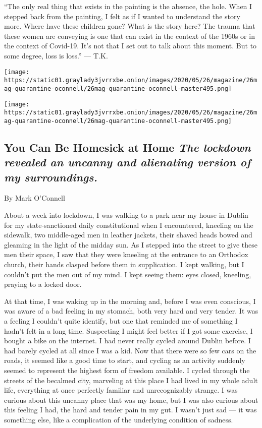 ``The only real thing that exists in the painting is the absence, the
hole. When I stepped back from the painting, I felt as if I wanted to
understand the story more. Where have these children gone? What is the
story here? The trauma that these women are conveying is one that can
exist in the context of the 1960s or in the context of Covid-19. It's
not that I set out to talk about this moment. But to some degree, loss
is loss.'' --- T.K.

\texttt{[image: https://static01.graylady3jvrrxbe.onion/images/2020/05/26/magazine/26mag-quarantine-oconnell/26mag-quarantine-oconnell-master495.png]}

\texttt{[image: https://static01.graylady3jvrrxbe.onion/images/2020/05/26/magazine/26mag-quarantine-oconnell/26mag-quarantine-oconnell-master495.png]}

\hypertarget{you-can-be-homesick-at-home-the-lockdown-revealed-an-uncanny-and-alienating-version-of-my-surroundings}{%
\subsection{\texorpdfstring{You Can Be Homesick at Home \emph{The
lockdown revealed an uncanny and alienating version of my
surroundings.}}{You Can Be Homesick at Home The lockdown revealed an uncanny and alienating version of my surroundings.}}\label{you-can-be-homesick-at-home-the-lockdown-revealed-an-uncanny-and-alienating-version-of-my-surroundings}}

By Mark O'Connell

About a week into lockdown, I was walking to a park near my house in
Dublin for my state-sanctioned daily constitutional when I encountered,
kneeling on the sidewalk, two middle-aged men in leather jackets, their
shaved heads bowed and gleaming in the light of the midday sun. As I
stepped into the street to give these men their space, I saw that they
were kneeling at the entrance to an Orthodox church, their hands clasped
before them in supplication. I kept walking, but I couldn't put the men
out of my mind. I kept seeing them: eyes closed, kneeling, praying to a
locked door.

At that time, I was waking up in the morning and, before I was even
conscious, I was aware of a bad feeling in my stomach, both very hard
and very tender. It was a feeling I couldn't quite identify, but one
that reminded me of something I hadn't felt in a long time. Suspecting I
might feel better if I got some exercise, I bought a bike on the
internet. I had never really cycled around Dublin before. I had barely
cycled at all since I was a kid. Now that there were so few cars on the
roads, it seemed like a good time to start, and cycling as an activity
suddenly seemed to represent the highest form of freedom available. I
cycled through the streets of the becalmed city, marveling at this place
I had lived in my whole adult life, everything at once perfectly
familiar and unrecognizably strange. I was curious about this uncanny
place that was my home, but I was also curious about this feeling I had,
the hard and tender pain in my gut. I wasn't just sad --- it was
something else, like a complication of the underlying condition of
sadness.

